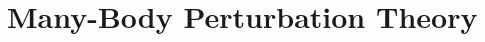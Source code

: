 \documentclass[UTF8]{ctexart}
\begin{document}
	\subsection{}
	
	\subsection{}
	
	\subsection{}
	
	\subsection{}
	
	\subsection{}
	
	\subsection{}
	

\section{Many-Body Perturbation Theory}
	\subsection{}
	
	\subsection{}
	
	\subsection{}
	
	\subsection{}
	
	\subsection{}
	
	\subsection{}
	
\end{document}
